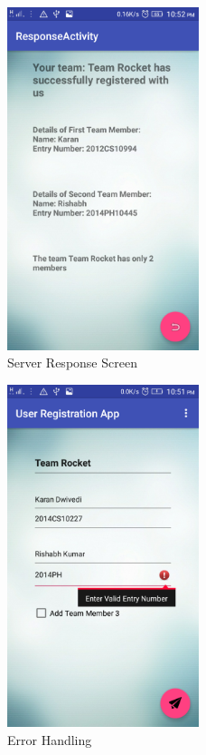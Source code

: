 \documentclass[12pt,a4paper,titlepage]{article}
\begin{document}
\begin{figure}[!ht]
	\centering
	\includegraphics[width=0.5\textwidth]{./screen_response}
	\caption{Server Response Screen}
\end{figure}
\begin{figure}[!ht]
	\centering
	\includegraphics[width=0.5\textwidth]{./screen_error}
	\caption{Error Handling}
\end{figure}
\end{document}
